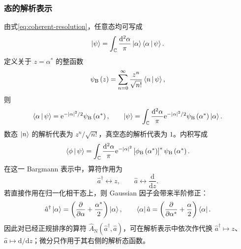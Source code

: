 \subsubsection{态的解析表示}
由式\eqref{eq:coherent-resolution}，任意态均可写成
\begin{equation}
\Ket{\psi}=\int_{\mathbb{C}}\frac{\mathrm{d}^2\alpha}{\pi}
\Ket{\alpha}\Braket{\alpha|\psi}.
\end{equation}
定义关于 $z=\alpha^*$ 的整函数
\begin{equation}
\psi_{\mathrm{B}}\left(z\right)
=\sum_{n=0}^{\infty}\frac{z^n}{\sqrt{n!}}\Braket{n|\psi},
\end{equation}
则
\begin{equation}
\Braket{\alpha|\psi}=\mathrm{e}^{-\left|\alpha\right|^2/2}
\psi_{\mathrm{B}}\left(\alpha^*\right),
\qquad
\Ket{\psi}=\int_{\mathbb{C}}\frac{\mathrm{d}^2\alpha}{\pi}
\mathrm{e}^{-\left|\alpha\right|^2/2}\psi_{\mathrm{B}}\left(\alpha^*\right)\Ket{\alpha}.
\end{equation}
数态 $\Ket{n}$ 的解析代表为 $z^n/\sqrt{n!}$，真空态的解析代表为 $1$。内积写成
\begin{equation}
\Braket{\phi|\psi}=\int_{\mathbb{C}}\frac{\mathrm{d}^2\alpha}{\pi}
\mathrm{e}^{-\left|\alpha\right|^2}
\left[\phi_{\mathrm{B}}\left(\alpha^*\right)\right]^*
\psi_{\mathrm{B}}\left(\alpha^*\right).
\end{equation}
在这一 Bargmann 表示中，算符作用为
\begin{equation}
\hat a^\dagger\longleftrightarrow z,
\qquad
\hat a\longleftrightarrow\frac{\mathrm{d}}{\mathrm{d}z}.
\label{eq:bargmann-ladder}
\end{equation}
若直接作用在归一化相干态上，则 Gaussian 因子会带来半阶修正：
\begin{equation}
\hat a^\dagger\Ket{\alpha}
=\left(\frac{\partial}{\partial\alpha}+\frac{\alpha^*}{2}\right)\Ket{\alpha},
\qquad
\Bra{\alpha}\hat a
=\left(\frac{\partial}{\partial\alpha^*}+\frac{\alpha}{2}\right)\Bra{\alpha}.
\end{equation}
因此对已经正规排序的算符 $\hat A_{\mathrm{N}}\left(\hat a^\dagger,\hat a\right)$，可在解析表示中依次作代换
$\hat a^\dagger\mapsto z$、$\hat a\mapsto\mathrm{d}/\mathrm{d}z$；微分只作用于其右侧的解析态函数。

